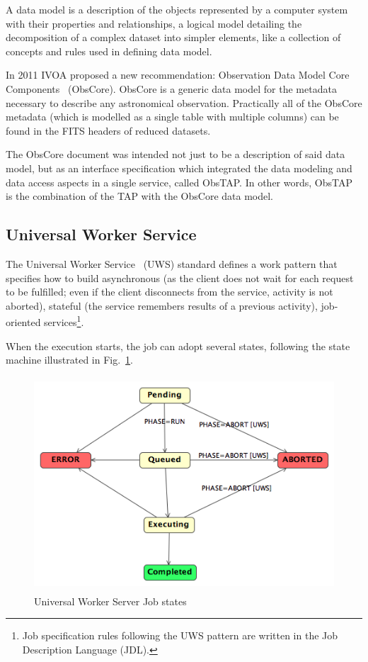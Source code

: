A data model is a description of the objects represented by a computer system with their properties and relationships, a logical model detailing the decomposition of a complex dataset into simpler elements, like a collection of concepts and rules used in defining data model. 

In 2011 IVOA proposed a new recommendation: Observation Data Model Core
Components~\cite{2011arXiv1111.1758L} (ObsCore). ObsCore is a 
generic data model for the metadata necessary to describe any astronomical observation. Practically all of the ObsCore metadata (which is modelled as a single table with multiple columns) can be found in the FITS headers of reduced datasets.

The ObsCore document was intended not just to be a description of said data model, but as an interface specification which integrated the data modeling and data access aspects in a single service, called ObsTAP.
In other words, ObsTAP is the combination of the TAP with the ObsCore data model.


\subsection{Universal Worker Service} %
\label{sub:universal_worker_service}

The Universal Worker Service~\cite{2010uws..irec.....H} (UWS) 
standard defines a work
pattern 
that specifies
how to build asynchronous (as the client does not wait for each request to be fulfilled; even if the client disconnects from the service, activity is not aborted), stateful (the service remembers results of a previous activity), job-oriented
services\footnote{Job specification rules following the UWS pattern are written in the Job Description Language (JDL).}.

When the execution starts, the job can adopt several states, following the state machine illustrated in Fig.~\ref{fig:jobstatuses}.

\begin{figure}[tb]
\centering
\includegraphics[height=8cm]{images/UWSStates.png}
\caption{Universal Worker Server Job states}
\label{fig:jobstatuses}
\end{figure}

